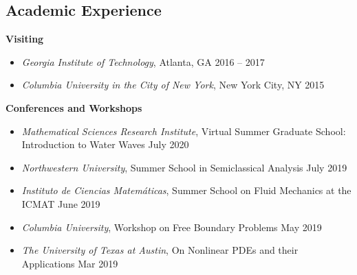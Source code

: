\documentclass[margin,line]{res}
\begin{document}
\begin{resume}


\renewcommand{\vvspace}{\vspace{0.1in}}
\newcommand{\nvspace}{\vspace{-0.00in}}

\section{\sc Academic Experience}

{\bf Visiting}
\vvspace

\begin{itemize}[leftmargin=0.15in, label=$\sqbullet$]
    \item \textit{Georgia Institute of Technology}, Atlanta, GA \hfill { 2016 -- 2017}
    \item \textit{Columbia University in the City of New York}, New York City, NY \hfill { 2015}
\end{itemize}

\nvspace 
{\bf Conferences and Workshops}
\vvspace

\begin{itemize}[leftmargin=0.15in, label=$\sqbullet$]

    \item \textit{Mathematical Sciences Research Institute},
    Virtual Summer Graduate School: Introduction to Water Waves
    \hfill July 2020
    
    \item \textit{Northwestern University},
    Summer School in Semiclassical Analysis
    \hfill July 2019
    
    \item \textit{Instituto de Ciencias Matemáticas},
    Summer School on Fluid Mechanics at the ICMAT
    \hfill June 2019
    
    \item \textit{Columbia University},
    Workshop on Free Boundary Problems 
    \hfill May 2019
    
    \item \textit{The University of Texas at Austin},
    On Nonlinear PDEs and their Applications 
    \hfill Mar 2019
    

\end{itemize}
\end{resume}
\end{document}
